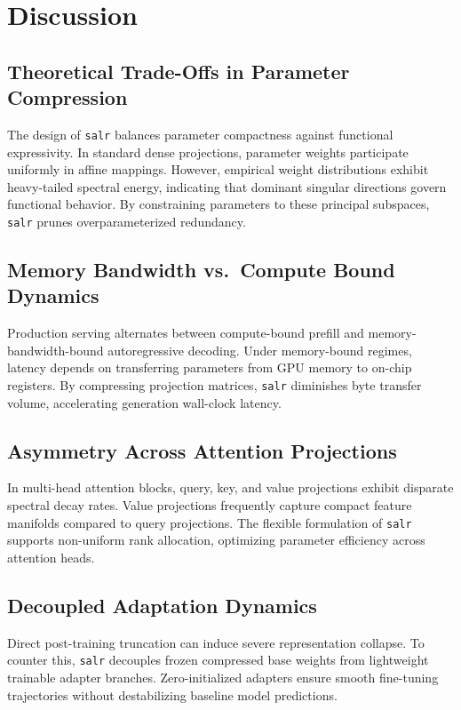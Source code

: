 \section{Discussion}

\subsection{Theoretical Trade-Offs in Parameter Compression}
The design of \texttt{salr} balances parameter compactness against functional expressivity. In standard dense projections, parameter weights participate uniformly in affine mappings. However, empirical weight distributions exhibit heavy-tailed spectral energy, indicating that dominant singular directions govern functional behavior. By constraining parameters to these principal subspaces, \texttt{salr} prunes overparameterized redundancy.

\subsection{Memory Bandwidth vs.\ Compute Bound Dynamics}
Production serving alternates between compute-bound prefill and memory-bandwidth-bound autoregressive decoding. Under memory-bound regimes, latency depends on transferring parameters from GPU memory to on-chip registers. By compressing projection matrices, \texttt{salr} diminishes byte transfer volume, accelerating generation wall-clock latency.

\subsection{Asymmetry Across Attention Projections}
In multi-head attention blocks, query, key, and value projections exhibit disparate spectral decay rates. Value projections frequently capture compact feature manifolds compared to query projections. The flexible formulation of \texttt{salr} supports non-uniform rank allocation, optimizing parameter efficiency across attention heads.

\subsection{Decoupled Adaptation Dynamics}
Direct post-training truncation can induce severe representation collapse. To counter this, \texttt{salr} decouples frozen compressed base weights from lightweight trainable adapter branches. Zero-initialized adapters ensure smooth fine-tuning trajectories without destabilizing baseline model predictions.

